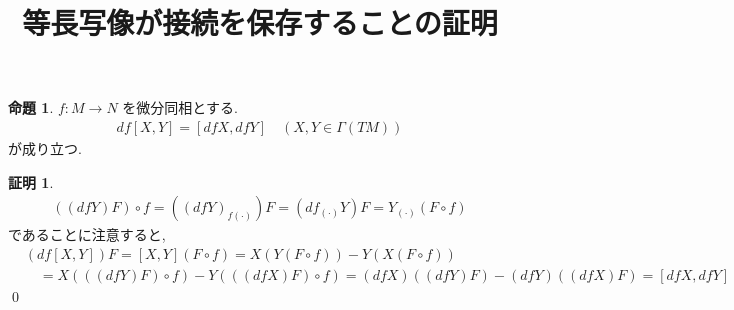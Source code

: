 \documentclass[twocolumn, landscape, a4paper , 8pt, fleqn, titlepage ]{jsarticle}
\title{等長写像が接続を保存することの証明}
\author{}
\date{}
\theoremstyle{definition}
\newtheorem{prop}[dfn]{命題}
\newtheorem*{pf*}{証明}
\begin{document}
\maketitle
\scriptsize 

\section{}

\begin{prop}
$f: M \rightarrow N$ を微分同相とする. 
\begin{align*} df[X,Y] = [dfX, dfY] \quad (X,Y \in \Gamma(TM))\end{align*}
が成り立つ. 
\end{prop}
\begin{pf*}
\begin{align*} ((dfY)F)\circ f = ((dfY)_{f(\cdot)})F = (df_{(\cdot)} Y) F = Y_{(\cdot)}(F\circ f) \end{align*}
であることに注意すると, 
\begin{align*} &(df[X,Y]) F = [X,Y] (F \circ f) = X (Y(F \circ f)) - Y(X(F \circ f)) \\& \quad = X(((dfY) F) \circ f) - Y (((dfX) F) \circ f) = (dfX)((dfY)F) - (dfY)((dfX)F) = [dfX, dfY] \end{align*}
\qed
\end{pf*}
\end{document}
